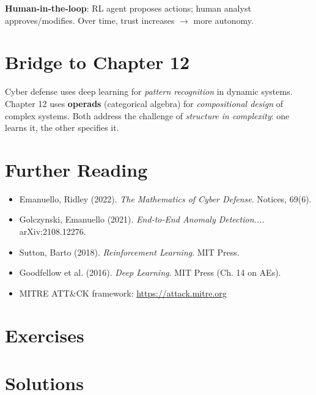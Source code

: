 \textbf{Human-in-the-loop}: RL agent proposes actions; human analyst approves/modifies. Over time, trust increases $\to$ more autonomy.

\section{Bridge to Chapter 12}
\label{sec:cyber:bridge} \cite{emanuello2022cyber}

Cyber defense uses deep learning for \emph{pattern recognition} in dynamic systems. Chapter 12 uses \textbf{operads} (categorical algebra) for \emph{compositional design} of complex systems. Both address the challenge of \emph{structure in complexity}: one learns it, the other specifies it.

\section{Further Reading}
\label{sec:cyber:refs} \cite{emanuello2022cyber}

\begin{itemize}
    \item Emanuello, Ridley (2022). \textit{The Mathematics of Cyber Defense}. Notices, 69(6).
    \item Golczynski, Emanuello (2021). \textit{End-to-End Anomaly Detection...}. arXiv:2108.12276.
    \item Sutton, Barto (2018). \textit{Reinforcement Learning}. MIT Press.
    \item Goodfellow et al. (2016). \textit{Deep Learning}. MIT Press (Ch. 14 on AEs).
    \item MITRE ATT\&CK framework: \url{https://attack.mitre.org}
\end{itemize}

\section{Exercises}
\section{Solutions}
\label{sec:cyber:solutions}

